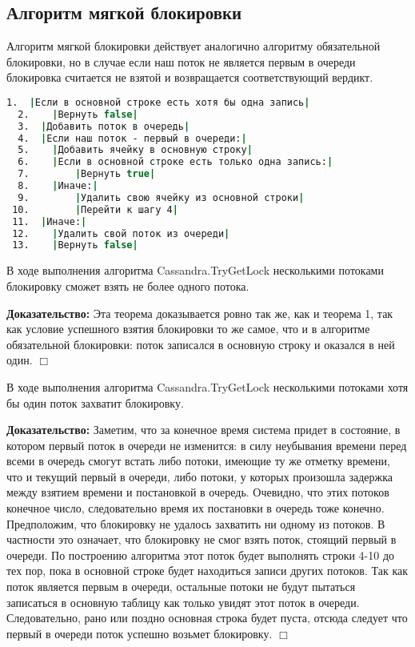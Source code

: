 \subsection{Алгоритм мягкой блокировки}

Алгоритм мягкой блокировки действует аналогично алгоритму обязательной блокировки, но в случае если наш поток не является первым в очереди блокировка считается не взятой и возвращается соответствующий вердикт.

\begin{lstlisting}[language=csh,caption={Алгоритм Cassandra.TryGetLock(lockId, threadId)}]
  1.  |Если в основной строке есть хотя бы одна запись|
  2.  	|Вернуть false|
  3.  |Добавить поток в очередь|
  4.  |Если наш поток - первый в очереди:|
  5.  	|Добавить ячейку в основную строку|
  6.  	|Если в основной строке есть только одна запись:|
  7.  		|Вернуть true|
  8.  	|Иначе:|
  9.  		|Удалить свою ячейку из основной строки|
 10.  		|Перейти к шагу 4|
 11.  |Иначе:|
 12.  	|Удалить свой поток из очереди|
 13.  	|Вернуть false|
\end{lstlisting}

\begin{theorem}
В ходе выполнения алгоритма Cassandra.TryGetLock несколькими потоками блокировку сможет взять не более одного потока.
\end{theorem}
\textbf{Доказательство:}
Эта теорема доказывается ровно так же, как и теорема 1, так как условие успешного взятия блокировки то же самое, что и в алгоритме обязательной блокировки: поток записался в основную строку и оказался в ней один.
$\Box$

\begin{theorem}
В ходе выполнения алгоритма Cassandra.TryGetLock несколькими потоками хотя бы один поток захватит блокировку.
\end{theorem}
\textbf{Доказательство:}
Заметим, что за конечное время система придет в состояние, в котором первый поток в очереди не изменится: в силу неубывания времени перед всеми в очередь смогут встать либо потоки, имеющие ту же отметку времени, что и текущий первый в очереди, либо потоки, у которых произошла задержка между взятием времени и постановкой в очередь. Очевидно, что этих потоков конечное число, следовательно время их постановки в очередь тоже конечно.
Предположим, что блокировку не удалось захватить ни одному из потоков. В частности это означает, что блокировку не смог взять поток, стоящий первый в очереди. По построению алгоритма этот поток будет выполнять строки 4-10 до тех пор, пока в основной строке будет находиться записи других потоков. Так как поток является первым в очереди, остальные потоки не будут пытаться записаться в основную таблицу как только увидят этот поток в очереди. Следовательно, рано или поздно основная строка будет пуста, отсюда следует что первый в очереди поток успешно возьмет блокировку.
$\Box$
